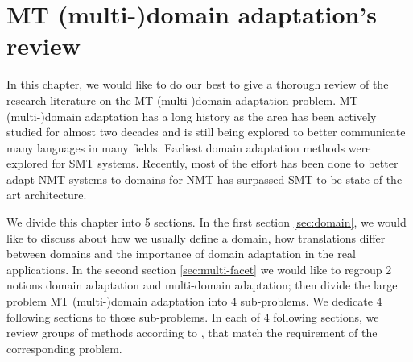 \chapter{MT (multi-)domain adaptation's review}
In this chapter, we would like to do our best to give a thorough review of the research literature on the MT (multi-)domain adaptation problem. MT (multi-)domain adaptation has a long history as the area has been actively studied for almost two decades and is still being explored to better communicate many languages in many fields. Earliest domain adaptation methods were explored for SMT systems. Recently, most of the effort has been done to better adapt NMT systems to domains for NMT has surpassed SMT to be state-of-the art architecture.

We divide this chapter into 5 sections. In the first section \ref{sec:domain}, we would like to discuss about how we usually define a domain, how translations differ between domains and the importance of domain adaptation in the real applications. In the second section \ref{sec:multi-facet} we would like to regroup 2 notions domain adaptation and multi-domain adaptation; then divide the large problem MT (multi-)domain adaptation into 4 sub-problems. We dedicate 4 following sections to those sub-problems. In each of 4 following sections, we review groups of methods according to \citet{Chu18survey}, that match the requirement of the corresponding problem.

